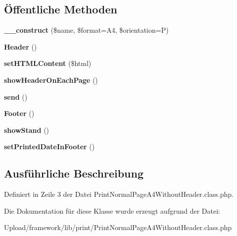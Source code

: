 \subsection*{Öffentliche Methoden}
\begin{DoxyCompactItemize}
\item 
\mbox{\label{class_print_normal_page_a4_without_header_ac8ae5ec8608ed2d0c9637c81bea0b2fa}} 
{\bfseries \+\_\+\+\_\+construct} (\$name, \$format=\textquotesingle{}A4\textquotesingle{}, \$orientation=\textquotesingle{}P\textquotesingle{})
\item 
\mbox{\label{class_print_normal_page_a4_without_header_a368fedc0bee5a71e6292e9f29b037949}} 
{\bfseries Header} ()
\item 
\mbox{\label{class_print_normal_page_a4_without_header_a448a63ebf0c13c3f112a5821d571baa6}} 
{\bfseries set\+H\+T\+M\+L\+Content} (\$html)
\item 
\mbox{\label{class_print_normal_page_a4_without_header_a24ad1c308f0f1b6a20d9954850e58586}} 
{\bfseries show\+Header\+On\+Each\+Page} ()
\item 
\mbox{\label{class_print_normal_page_a4_without_header_a581b42e2353001ae6d0fa8ac10a465dc}} 
{\bfseries send} ()
\item 
\mbox{\label{class_print_normal_page_a4_without_header_af944b177f5d64f3bd310fed68e1714f3}} 
{\bfseries Footer} ()
\item 
\mbox{\label{class_print_normal_page_a4_without_header_a94f473af82d12c6d53cdef5223fe47dc}} 
{\bfseries show\+Stand} ()
\item 
\mbox{\label{class_print_normal_page_a4_without_header_a00a25820a530683942651b02813ecb1e}} 
{\bfseries set\+Printed\+Date\+In\+Footer} ()
\end{DoxyCompactItemize}


\subsection{Ausführliche Beschreibung}


Definiert in Zeile 3 der Datei Print\+Normal\+Page\+A4\+Without\+Header.\+class.\+php.



Die Dokumentation für diese Klasse wurde erzeugt aufgrund der Datei\+:\begin{DoxyCompactItemize}
\item 
Upload/framework/lib/print/Print\+Normal\+Page\+A4\+Without\+Header.\+class.\+php\end{DoxyCompactItemize}
